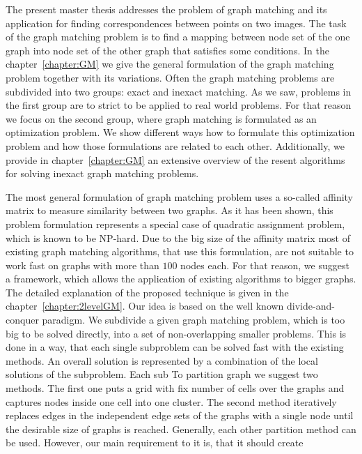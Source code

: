 The present master thesis addresses the problem of graph matching and its application for finding correspondences between points on two images.  The task of the graph matching problem is to find a mapping between node set of the one graph into node set of the other graph that satisfies some conditions. In the chapter~\ref{chapter:GM} we give the general formulation of the graph matching problem together with its variations. Often the graph matching problems are subdivided into two groups: exact and inexact matching. As we saw, problems in the first group are to strict to be applied to real world problems. For that reason we focus on the second group, where graph matching is formulated as an optimization problem. We show different ways how to formulate this optimization problem and how those formulations are related to each other. Additionally, we provide in chapter~\ref{chapter:GM} an extensive overview of the resent algorithms for solving inexact graph matching problems. 

The most general formulation of graph matching problem uses a so-called affinity matrix to measure similarity between two graphs. As it has been shown, this problem formulation represents a special case of quadratic assignment problem, which is known to be NP-hard. Due to the big size of the affinity matrix most of existing graph matching algorithms, that use this formulation, are not suitable to work fast on graphs with more than $100$ nodes each. For that reason, we suggest a framework, which allows the application of existing algorithms to bigger graphs. The detailed explanation of the proposed technique is given in the chapter~\ref{chapter:2levelGM}. Our idea is based on the well known divide-and-conquer paradigm. We subdivide a given graph matching problem, which is too big to be solved directly, into a set of non-overlapping smaller problems. This is done in a way, that each single subproblem can be solved fast with the existing methods. An overall solution is represented by a combination of the local solutions of the subproblem. 
Each sub
To partition graph we suggest two methods. The first one puts a grid with fix number of cells over the graphs and captures nodes inside one cell into one cluster. The second method iteratively replaces edges in the independent edge sets of the graphs with a single node until the desirable size of graphs is reached. Generally, each other partition method can be used. However, our main requirement to it is, that it should create

